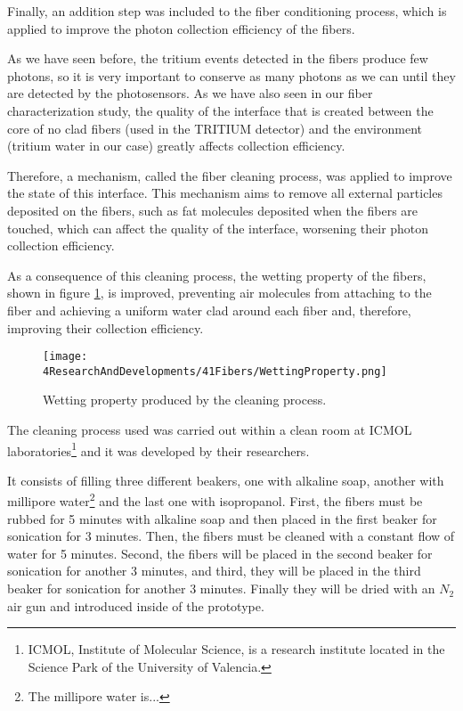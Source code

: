 Finally, an addition step was included to the fiber conditioning process, which is applied to improve the photon collection efficiency of the fibers. 

As we have seen before, the tritium events detected in the fibers produce few photons, so it is very important to conserve as many photons as we can until they are detected by the photosensors. As we have also seen in our fiber characterization study, the quality of the interface that is created between the core of no clad fibers (used in the TRITIUM detector) and the environment (tritium water in our case) greatly affects collection efficiency.

Therefore, a mechanism, called the fiber cleaning process, was applied to improve the state of this interface. This mechanism aims to remove all external particles deposited on the fibers, such as fat molecules deposited when the fibers are touched, which can affect the quality of the interface, worsening their photon collection efficiency. 

As a consequence of this cleaning process, the wetting property of the fibers, shown in figure \ref{fig:WettingProperty}, is improved, preventing air molecules from attaching to the fiber and achieving a uniform water clad around each fiber and, therefore, improving their collection efficiency. 


\begin{figure}[h]
\centering
\texttt{[image: 4ResearchAndDevelopments/41Fibers/WettingProperty.png]}
\caption{Wetting property produced by the cleaning process. \cite{}\label{fig:WettingProperty}}
\end{figure}


The cleaning process used was carried out within a clean room at ICMOL laboratories\footnote{ICMOL, Institute of Molecular Science, is a research institute located in the Science Park of the University of Valencia.} and it was developed by their researchers.

It consists of filling three different beakers, one with alkaline soap, another with millipore water\footnote{The millipore water is...} and the last one with isopropanol. First, the fibers must be rubbed for 5 minutes with alkaline soap and then placed in the first beaker for sonication for 3 minutes. Then, the fibers must be cleaned with a constant flow of water for 5 minutes. Second, the fibers will be placed in the second beaker for sonication for another 3 minutes, and third, they will be placed in the third beaker for sonication for another 3 minutes. Finally they will be dried with an $N_2$ air gun and introduced inside of the prototype.

